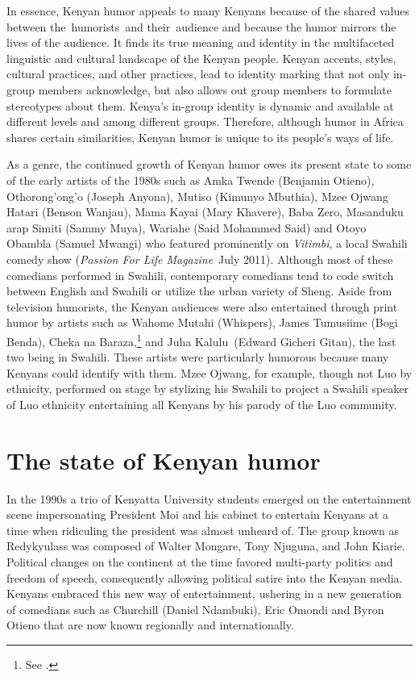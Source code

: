 \documentclass[output=paper]{langsci/langscibook}
\begin{document}
In essence, Kenyan humor appeals to many Kenyans because of the shared values between the~humorists~and their~audience and because the humor mirrors the lives of the audience. It finds its true meaning and identity in the multifaceted linguistic and cultural landscape of the Kenyan people. Kenyan accents, styles, cultural practices, and other practices, lead to identity marking that not only in-group members acknowledge, but also allows out group members to formulate stereotypes about them. Kenya’s in-group identity is dynamic and available at different levels and among different groups. Therefore, although humor in Africa shares certain similarities, Kenyan humor is unique to its people’s ways of life.

As a genre, the continued growth of Kenyan humor owes its present state to some of the early artists of the 1980s such as Amka Twende (Benjamin Otieno), Othorong’ong’o (Joseph Anyona), Mutiso (Kimunyo Mbuthia), Mzee Ojwang Hatari (Benson Wanjau), Mama Kayai (Mary Khavere), Baba Zero, Masanduku arap Simiti (Sammy Muya), Wariahe (Said Mohammed Said) and Otoyo Obambla (Samuel Mwangi) who featured prominently on \textit{Vitimbi}, a local Swahili comedy show (\textit{Passion For Life Magazine}~July 2011). Although most of these comedians performed in Swahili, contemporary comedians tend to code switch between English and Swahili or utilize the urban variety of Sheng. Aside from television humorists, the Kenyan audiences were also entertained through print humor by artists such as Wahome Mutahi (Whispers), James Tumusiime (Bogi Benda), Cheka na Baraza,\footnote{ See \citet{Rhoades1977}.} and Juha Kalulu~(Edward Gicheri Gitau), the last two being in Swahili. These artists were particularly humorous because many Kenyans could identify with them. Mzee Ojwang, for example, though not Luo by ethnicity, performed on stage by stylizing his Swahili to project a Swahili speaker of Luo ethnicity entertaining all Kenyans by his parody of the Luo community.

\section{The state of Kenyan humor}

   In the 1990s a trio of Kenyatta University students emerged on the entertainment scene impersonating President Moi and his cabinet to entertain Kenyans at a time when ridiculing the president was almost unheard of. The group known as Redykyulass was composed of Walter Mongare, Tony Njuguna, and John Kiarie. Political changes on the continent at the time favored multi-party politics and freedom of speech, consequently allowing political satire into the Kenyan media. Kenyans embraced this new way of entertainment, ushering in a new generation of comedians such as Churchill (Daniel Ndambuki), Eric Omondi and Byron Otieno that are now known regionally and internationally. 
\end{document}
